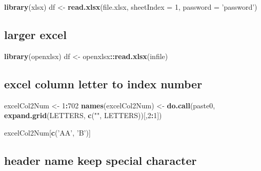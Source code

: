 \documentclass[
]{book}
\newenvironment{Shaded}{\begin{snugshade}}{\end{snugshade}}
\newcommand{\DataTypeTok}[1]{\textcolor[rgb]{0.13,0.29,0.53}{#1}}
\newcommand{\DecValTok}[1]{\textcolor[rgb]{0.00,0.00,0.81}{#1}}
\newcommand{\KeywordTok}[1]{\textcolor[rgb]{0.13,0.29,0.53}{\textbf{#1}}}
\newcommand{\NormalTok}[1]{#1}
\newcommand{\OperatorTok}[1]{\textcolor[rgb]{0.81,0.36,0.00}{\textbf{#1}}}
\newcommand{\StringTok}[1]{\textcolor[rgb]{0.31,0.60,0.02}{#1}}
\begin{document}
\begin{Shaded}
\begin{Highlighting}[]
\KeywordTok{library}\NormalTok{(xlsx)}
\NormalTok{df <-}\StringTok{ }\KeywordTok{read.xlsx}\NormalTok{(file.xlsx,}
                \DataTypeTok{sheetIndex =} \DecValTok{1}\NormalTok{,}
                \DataTypeTok{password =} \StringTok{'password'}\NormalTok{)}
\end{Highlighting}
\end{Shaded}

\hypertarget{larger-excel}{%
\subsection{larger excel}\label{larger-excel}}

\begin{Shaded}
\begin{Highlighting}[]
\KeywordTok{library}\NormalTok{(openxlsx)}
\NormalTok{df <-}\StringTok{ }\NormalTok{openxlsx}\OperatorTok{::}\KeywordTok{read.xlsx}\NormalTok{(infile)}
\end{Highlighting}
\end{Shaded}

\hypertarget{excel-column-letter-to-index-number}{%
\subsection{excel column letter to index number}\label{excel-column-letter-to-index-number}}

\begin{Shaded}
\begin{Highlighting}[]
\NormalTok{excelCol2Num <-}\StringTok{ }\DecValTok{1}\OperatorTok{:}\DecValTok{702}
\KeywordTok{names}\NormalTok{(excelCol2Num) <-}\StringTok{ }\KeywordTok{do.call}\NormalTok{(paste0, }\KeywordTok{expand.grid}\NormalTok{(LETTERS, }\KeywordTok{c}\NormalTok{(}\StringTok{""}\NormalTok{, LETTERS))[,}\DecValTok{2}\OperatorTok{:}\DecValTok{1}\NormalTok{])}

\NormalTok{excelCol2Num[}\KeywordTok{c}\NormalTok{(}\StringTok{'AA'}\NormalTok{, }\StringTok{'B'}\NormalTok{)]}
\end{Highlighting}
\end{Shaded}

\hypertarget{header-name-keep-special-character}{%
\subsection{header name keep special character}\label{header-name-keep-special-character}}
\end{document}
